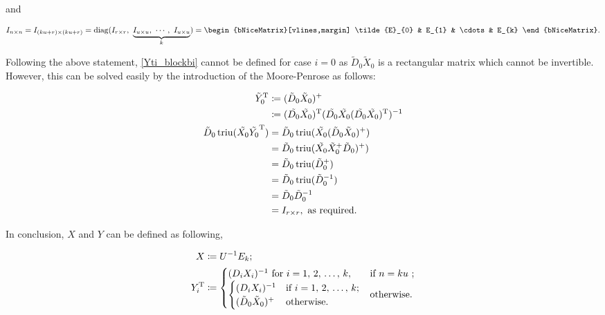 \noindent and


\begin{align*}
    I_{n \times n} = I_{(ku+r) \times (ku+r)} = \diag(I_{r \times r},\ \underbrace{I_{u \times u},\ \cdots,\ I_{u \times u}}_{k}) =
    \begin{bNiceMatrix}[vlines,margin]
        \tilde{E}_{0} & E_{1} & \cdots & E_{k}
    \end{bNiceMatrix}.
\end{align*}


\noindent Following the above statement, \eqref{Yti_blockbi} cannot be defined for case $i=0$ as $\tilde{D}_{0} \tilde{X}_{0}$ is a rectangular matrix which cannot be invertible.
However, this can be solved easily by the introduction of the Moore-Penrose as follows:


\begin{align*}
    \tilde{Y}_{0}^{\mathrm{T}} &\coloneqq (\tilde{D}_{0} \tilde{X}_{0})^{+} \\
        &\coloneqq (\tilde{D_{0}} \tilde{X_{0}})^{\mathrm{T}} (\tilde{D_{0}} \tilde{X_{0}} (\tilde{D_{0}} \tilde{X_{0}})^{\mathrm{T}})^{-1} \\
    \tilde{D}_{0} \mathop{\mathrm{triu}}(\tilde{X_{0}} \tilde{Y_{0}}^{\mathrm{T}}) &= \tilde{D}_{0} \mathop{\mathrm{triu}}(\tilde{X_{0}} (\tilde{D}_{0} \tilde{X}_{0})^{+}) \\
        &= \tilde{D}_{0} \mathop{\mathrm{triu}}(\tilde{X_{0}} \tilde{X}_{0}^{+} \tilde{D}_{0})^{+})\\
        &= \tilde{D}_{0} \mathop{\mathrm{triu}}(\tilde{D}_{0}^{+})\\
        &= \tilde{D}_{0} \mathop{\mathrm{triu}}(\tilde{D}_{0}^{-1})\\
        &= \tilde{D}_{0} \tilde{D}_{0}^{-1}\\
        &= I_{r \times r},\ \text{as required}.
\end{align*}


In conclusion, $X$ and $Y$ can be defined as following,

\begin{align*}
    X &\coloneqq U^{-1} E_{k}; \\
    Y_{i}^{\mathrm{T}} &\coloneqq 
    \begin{cases}
        (D_{i} X_{i})^{-1}\ \text{for} \ i = 1,\, 2,\, \dots,\, k, & \text{if} \ n=ku \ ;\\
        \begin{cases}
            (D_{i} X_{i})^{-1} & \text{if} \ i = 1,\, 2,\, \dots,\, k ;\\
            (\tilde{D}_{0} \tilde{X}_{0})^{+}  & \text{otherwise}.
        \end{cases}
        & \text{otherwise}.
    \end{cases}
\end{align*}
















